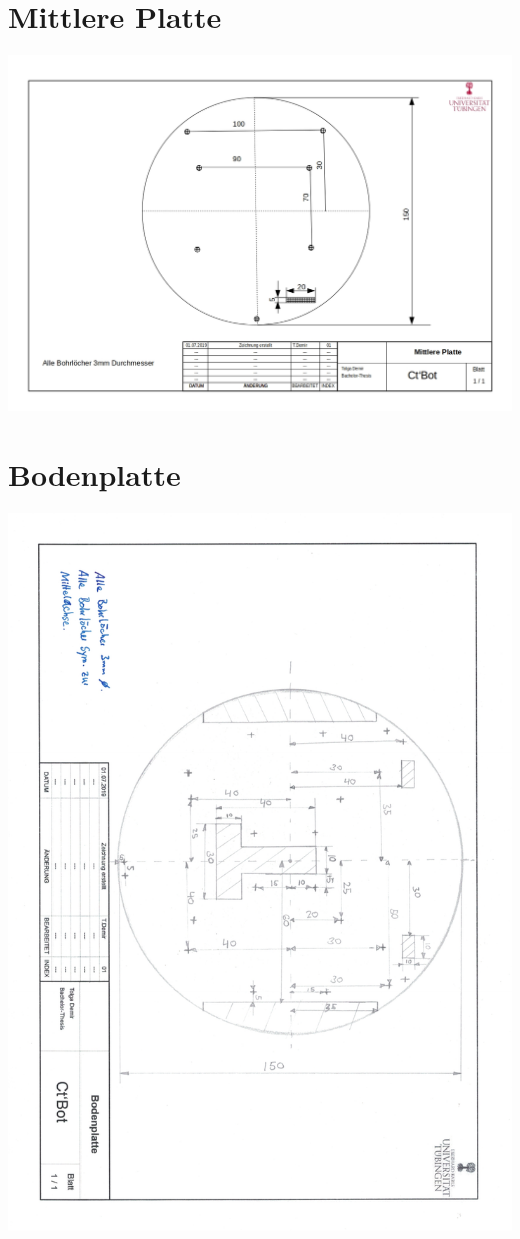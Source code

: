 \documentclass[a4paper,cleardoubleempty,BCOR1cm]{book}
\begin{document}
\section{Mittlere Platte}
\includegraphics[angle=90,origin=c, scale= 0.7]{images/Zeichnung_mittlere_Platte.jpg}
\section{Bodenplatte}
\includegraphics[angle=180,origin=c, scale= 0.7]{images/Bodenplatte.pdf}
\end{document}
